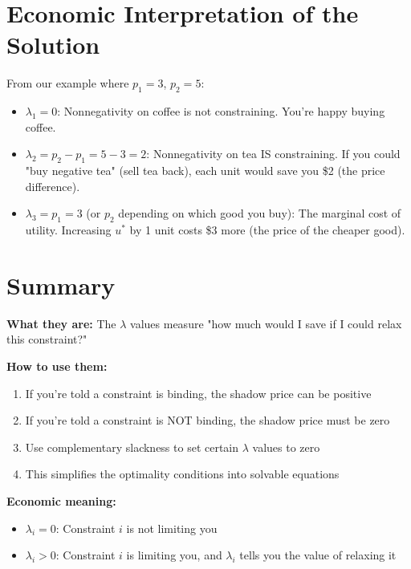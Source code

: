 \documentclass[11pt]{article}
\begin{document}
\section{Economic Interpretation of the Solution}

From our example where $p_1 = 3$, $p_2 = 5$:

\begin{itemize}
\item $\lambda_1 = 0$: Nonnegativity on coffee is not constraining. You're happy buying coffee.

\item $\lambda_2 = p_2 - p_1 = 5 - 3 = 2$: Nonnegativity on tea IS constraining. If you could "buy negative tea" (sell tea back), each unit would save you \$2 (the price difference).

\item $\lambda_3 = p_1 = 3$ (or $p_2$ depending on which good you buy): The marginal cost of utility. Increasing $u^*$ by 1 unit costs \$3 more (the price of the cheaper good).
\end{itemize}

\section{Summary}

\begin{tcolorbox}[colback=blue!5!white,colframe=blue!75!black,title=Shadow Prices in Plain English]

\textbf{What they are:} The $\lambda$ values measure "how much would I save if I could relax this constraint?"

\textbf{How to use them:}
\begin{enumerate}
\item If you're told a constraint is binding, the shadow price can be positive
\item If you're told a constraint is NOT binding, the shadow price must be zero
\item Use complementary slackness to set certain $\lambda$ values to zero
\item This simplifies the optimality conditions into solvable equations
\end{enumerate}

\textbf{Economic meaning:}
\begin{itemize}
\item $\lambda_i = 0$: Constraint $i$ is not limiting you
\item $\lambda_i > 0$: Constraint $i$ is limiting you, and $\lambda_i$ tells you the value of relaxing it
\end{itemize}

\end{tcolorbox}
\end{document}
